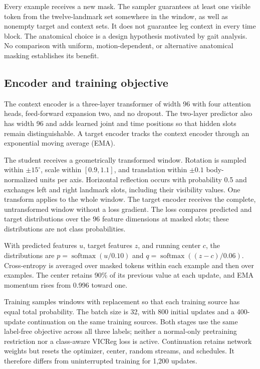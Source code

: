 \documentclass[10pt,twocolumn,letterpaper]{article}
\begin{document}
Every example receives a new mask. The sampler guarantees at least one visible token from the twelve-landmark set somewhere in the window, as well as nonempty target and context sets. It does not guarantee leg context in every time block. The anatomical choice is a design hypothesis motivated by gait analysis. No comparison with uniform, motion-dependent, or alternative anatomical masking establishes its benefit.

\subsection{Encoder and training objective}
The context encoder is a three-layer transformer of width 96 with four attention heads, feed-forward expansion two, and no dropout. The two-layer predictor also has width 96 and adds learned joint and time positions so that hidden slots remain distinguishable. A target encoder tracks the context encoder through an exponential moving average (EMA).

The student receives a geometrically transformed window. Rotation is sampled within $\pm15^\circ$, scale within $[0.9,1.1]$, and translation within $\pm0.1$ body-normalized units per axis. Horizontal reflection occurs with probability 0.5 and exchanges left and right landmark slots, including their visibility values. One transform applies to the whole window. The target encoder receives the complete, untransformed window without a loss gradient. The loss compares predicted and target distributions over the 96 feature dimensions at masked slots; these distributions are not class probabilities.

With predicted features $u$, target features $z$, and running center $c$, the distributions are $p=\operatorname{softmax}(u/0.10)$ and $q=\operatorname{softmax}((z-c)/0.06)$. Cross-entropy is averaged over masked tokens within each example and then over examples. The center retains 90\% of its previous value at each update, and EMA momentum rises from 0.996 toward one.

Training samples windows with replacement so that each training source has equal total probability. The batch size is 32, with 800 initial updates and a 400-update continuation on the same training sources. Both stages use the same label-free objective across all three labels; neither a normal-only pretraining restriction nor a class-aware VICReg loss is active. Continuation retains network weights but resets the optimizer, center, random streams, and schedules. It therefore differs from uninterrupted training for 1,200 updates.
\end{document}
